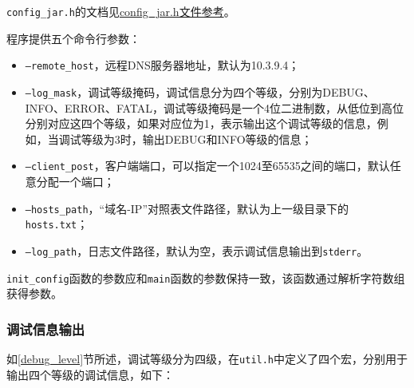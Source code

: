 \documentclass[lang=cn,11pt,a4paper,cite=authornum]{paper}
\begin{document}
\texttt{config_jar.h}的文档见\href{run:./APIdoc/config__jar_8h.html}{config\_jar.h文件参考}。

程序提供五个命令行参数\label{para}：

\begin{itemize}
    \item \texttt{--remote_host}，远程DNS服务器地址，默认为10.3.9.4；
    \item \texttt{--log_mask}，\label{debug_level}调试等级掩码，调试信息分为四个等级，分别为DEBUG、INFO、ERROR、FATAL，调试等级掩码是一个4位二进制数，从低位到高位分别对应这四个等级，如果对应位为1，表示输出这个调试等级的信息，例如，当调试等级为3时，输出DEBUG和INFO等级的信息；
    \item \texttt{--client_post}，客户端端口，可以指定一个1024至65535之间的端口，默认任意分配一个端口；
    \item \texttt{--hosts_path}，“域名-IP”对照表文件路径，默认为上一级目录下的\texttt{hosts.txt}；
    \item \texttt{--log_path}，日志文件路径，默认为空，表示调试信息输出到\texttt{stderr}。
\end{itemize}

\texttt{init_config}函数的参数应和\texttt{main}函数的参数保持一致，该函数通过解析字符数组获得参数。

\subsubsection{调试信息输出}

如\ref{debug_level}节所述，调试等级分为四级，在\texttt{util.h}中定义了四个宏，分别用于输出四个等级的调试信息，如下：
\end{document}
